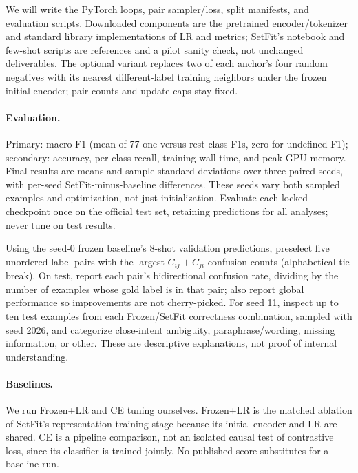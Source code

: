 \documentclass{article}
\begin{document}
We will write the PyTorch loops, pair sampler/loss, split manifests, and evaluation scripts. Downloaded components are the pretrained encoder/tokenizer and standard library implementations of LR and metrics; SetFit's notebook and few-shot scripts \cite{setfitcode} are references and a pilot sanity check, not unchanged deliverables. The optional variant replaces two of each anchor's four random negatives with its nearest different-label training neighbors under the frozen initial encoder; pair counts and update caps stay fixed.

\paragraph{Evaluation.}
Primary: macro-F1 (mean of 77 one-versus-rest class F1s, zero for undefined F1); secondary: accuracy, per-class recall, training wall time, and peak GPU memory. Final results are means and sample standard deviations over three paired seeds, with per-seed SetFit-minus-baseline differences. These seeds vary both sampled examples and optimization, not just initialization. Evaluate each locked checkpoint once on the official test set, retaining predictions for all analyses; never tune on test results.

Using the seed-0 frozen baseline's 8-shot validation predictions, preselect five unordered label pairs with the largest $C_{ij}+C_{ji}$ confusion counts (alphabetical tie break). On test, report each pair's bidirectional confusion rate, dividing by the number of examples whose gold label is in that pair; also report global performance so improvements are not cherry-picked. For seed 11, inspect up to ten test examples from each Frozen/SetFit correctness combination, sampled with seed 2026, and categorize close-intent ambiguity, paraphrase/wording, missing information, or other. These are descriptive explanations, not proof of internal understanding.

\paragraph{Baselines.}
We run Frozen+LR and CE tuning ourselves. Frozen+LR is the matched ablation of SetFit's representation-training stage because its initial encoder and LR are shared. CE is a pipeline comparison, not an isolated causal test of contrastive loss, since its classifier is trained jointly. No published score substitutes for a baseline run.
\end{document}
